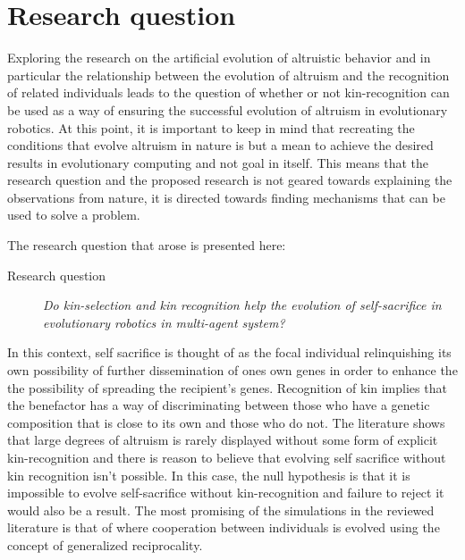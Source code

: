 \documentclass[a4paper]{book}
\begin{document}
\section{Research question}
\label{sec:discussion}



Exploring the research on the artificial evolution of altruistic behavior and in particular the relationship between the evolution of altruism and the recognition of related individuals leads to the question of whether or not kin-recognition can be used as a way of ensuring the successful evolution of altruism in evolutionary robotics. 
At this point, it is important to keep in mind that recreating the conditions that evolve altruism in nature is but a mean to achieve the desired results in evolutionary computing and not goal in itself. 
This means that the research question and the proposed research is not geared towards explaining the observations from nature, it is directed towards finding mechanisms that can be used to solve a problem.

The research question that arose is presented here:


\begin{description}
\item[Research question] {\it Do kin-selection and kin recognition help the evolution of self-sacrifice in evolutionary robotics in multi-agent system? }
\end{description}

In this context, self sacrifice is thought of as the focal individual relinquishing its own possibility of further dissemination of ones own genes in order to enhance the the possibility of spreading the recipient's genes.
Recognition of kin implies that the benefactor has a way of discriminating between those who have a genetic composition that is close to its own and those who do not.
The literature shows that large degrees of altruism is rarely displayed without some form of explicit kin-recognition and there is reason to believe that evolving self sacrifice without kin recognition isn't possible. 
In this case, the null hypothesis is that it is impossible to evolve self-sacrifice without kin-recognition and failure to reject it would also be a result. 
The most promising of the simulations in the reviewed literature is that of \cite{barta_cooperation_2010} where cooperation between individuals is evolved using the concept of generalized reciprocality.  
\end{document}
